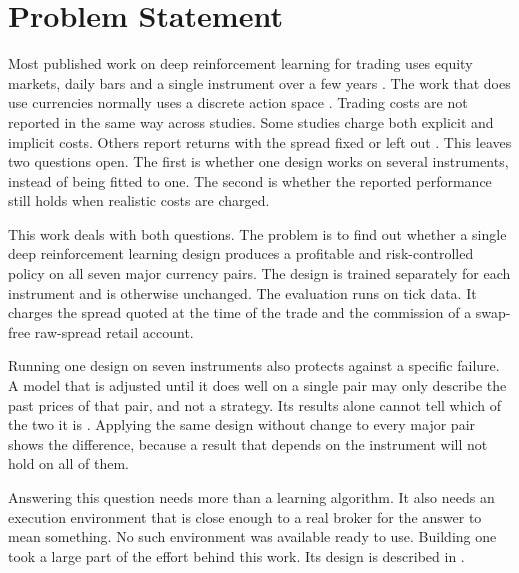 \section{Problem Statement}

Most published work on deep reinforcement learning for trading uses equity markets, daily bars and a single instrument over a few years \cite{hambly_recent_2023, fischer_reinforcement_2018, alameer_reinforcement_2022}. The work that does use currencies normally uses a discrete action space \cite{carapuco_reinforcement_2018, huang_financial_2018, rundo_deep_2019}. Trading costs are not reported in the same way across studies. Some studies charge both explicit and implicit costs. Others report returns with the spread fixed or left out \cite{pricope_deep_2021}. This leaves two questions open. The first is whether one design works on several instruments, instead of being fitted to one. The second is whether the reported performance still holds when realistic costs are charged.

This work deals with both questions. The problem is to find out whether a single deep reinforcement learning design produces a profitable and risk-controlled policy on all seven major currency pairs. The design is trained separately for each instrument and is otherwise unchanged. The evaluation runs on tick data. It charges the spread quoted at the time of the trade and the commission of a swap-free raw-spread retail account.

Running one design on seven instruments also protects against a specific failure. A model that is adjusted until it does well on a single pair may only describe the past prices of that pair, and not a strategy. Its results alone cannot tell which of the two it is \cite{bailey_pseudo-mathematics_2014}. Applying the same design without change to every major pair shows the difference, because a result that depends on the instrument will not hold on all of them.

Answering this question needs more than a learning algorithm. It also needs an execution environment that is close enough to a real broker for the answer to mean something. No such environment was available ready to use. Building one took a large part of the effort behind this work. Its design is described in .